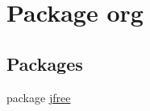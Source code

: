 \hypertarget{namespaceorg}{}\section{Package org}
\label{namespaceorg}
\subsection*{Packages}
\begin{DoxyCompactItemize}
\item 
package \mbox{\hyperlink{namespaceorg_1_1jfree}{jfree}}
\end{DoxyCompactItemize}
